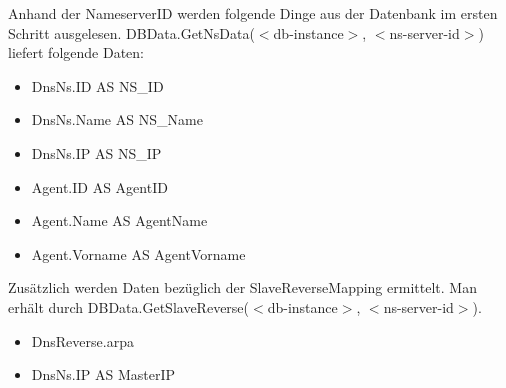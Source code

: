 Anhand der NameserverID werden folgende Dinge aus der Datenbank im
ersten Schritt ausgelesen.  DBData.GetNsData($<$db-instance$>$,
$<$ns-server-id$>$) liefert folgende Daten:

\begin{itemize}
\item DnsNs.ID AS NS\_ID
\item DnsNs.Name AS NS\_Name
\item DnsNs.IP AS NS\_IP
\item Agent.ID AS AgentID
\item Agent.Name AS AgentName
\item Agent.Vorname AS AgentVorname
\end{itemize}

Zus\"atzlich werden Daten bez\"uglich der SlaveReverseMapping ermittelt.
Man erh\"alt durch DBData.GetSlaveReverse($<$db-instance$>$, $<$ns-server-id$>$).

\begin{itemize}
\item DnsReverse.arpa
\item DnsNs.IP AS MasterIP
\end{itemize}
